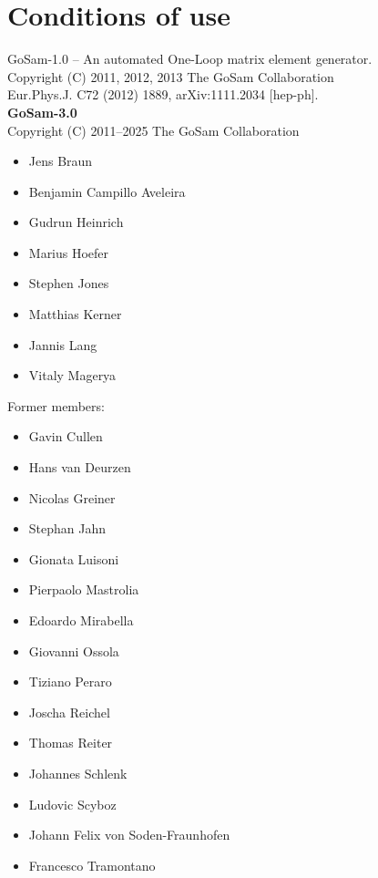 \documentclass[11pt,a4paper]{refrep}
\newcommand{\gosam}{{\sc GoSam}\xspace}
\begin{document}
\chapter*{Conditions of use}
    GoSam-1.0 -- An automated One-Loop matrix element generator.\\
    Copyright (C) 2011, 2012, 2013  The GoSam Collaboration\\
    Eur.Phys.J. C72 (2012) 1889, arXiv:1111.2034 [hep-ph].\\
    
    {\bf GoSam-3.0}  \\
    Copyright (C) 2011--2025  The \gosam Collaboration
   \begin{itemize}         
      \setlength\itemsep{-0.5em}
      \item Jens Braun
      \item Benjamin Campillo  Aveleira      
      \item Gudrun Heinrich                  
      \item Marius Hoefer
      \item Stephen Jones
      \item Matthias Kerner
      \item Jannis Lang
      \item Vitaly Magerya

   \end{itemize}

    Former members:
    \begin{itemize}
      \setlength\itemsep{-0.5em}
      \item Gavin Cullen
      \item Hans van Deurzen
      \item Nicolas Greiner
      \item Stephan Jahn
      \item Gionata Luisoni
      \item Pierpaolo Mastrolia
      \item Edoardo Mirabella
      \item Giovanni Ossola
		\item Tiziano Peraro
      \item Joscha Reichel
		\item Thomas Reiter
		\item Johannes Schlenk
		\item Ludovic Scyboz
		\item Johann Felix von Soden-Fraunhofen
      \item Francesco Tramontano
    \end{itemize}
   
\end{document}
